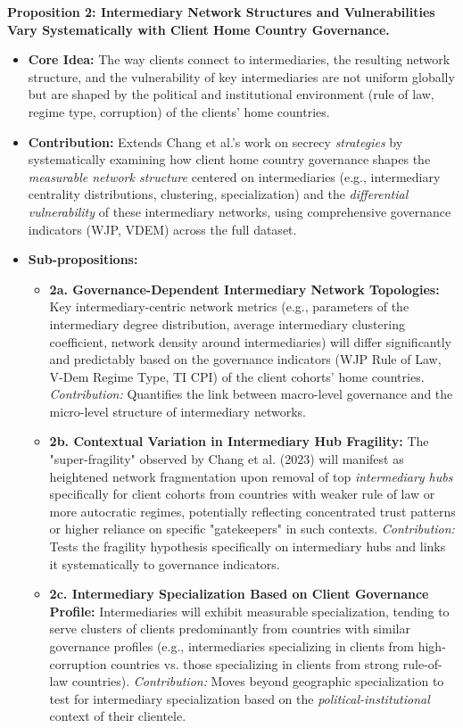 \textbf{Proposition 2: Intermediary Network Structures and Vulnerabilities Vary Systematically with Client Home Country Governance.}
\begin{itemize}[leftmargin=*]
    \item \textbf{Core Idea:} The way clients connect to intermediaries, the resulting network structure, and the vulnerability of key intermediaries are not uniform globally but are shaped by the political and institutional environment (rule of law, regime type, corruption) of the clients' home countries.
    \item \textbf{Contribution:} Extends Chang et al.'s work on secrecy \textit{strategies} by systematically examining how client home country governance shapes the \textit{measurable network structure} centered on intermediaries (e.g., intermediary centrality distributions, clustering, specialization) and the \textit{differential vulnerability} of these intermediary networks, using comprehensive governance indicators (WJP, VDEM) across the full dataset.
    \item \textbf{Sub-propositions:}
    \begin{itemize}[leftmargin=\parindent]
        \item \textbf{2a. Governance-Dependent Intermediary Network Topologies:} Key intermediary-centric network metrics (e.g., parameters of the intermediary degree distribution, average intermediary clustering coefficient, network density around intermediaries) will differ significantly and predictably based on the governance indicators (WJP Rule of Law, V-Dem Regime Type, TI CPI) of the client cohorts' home countries. \textit{Contribution:} Quantifies the link between macro-level governance and the micro-level structure of intermediary networks.
        \item \textbf{2b. Contextual Variation in Intermediary Hub Fragility:} The "super-fragility" observed by Chang et al. (2023) will manifest as heightened network fragmentation upon removal of top \textit{intermediary hubs} specifically for client cohorts from countries with weaker rule of law or more autocratic regimes, potentially reflecting concentrated trust patterns or higher reliance on specific "gatekeepers" in such contexts. \textit{Contribution:} Tests the fragility hypothesis specifically on intermediary hubs and links it systematically to governance indicators.
        \item \textbf{2c. Intermediary Specialization Based on Client Governance Profile:} Intermediaries will exhibit measurable specialization, tending to serve clusters of clients predominantly from countries with similar governance profiles (e.g., intermediaries specializing in clients from high-corruption countries vs. those specializing in clients from strong rule-of-law countries). \textit{Contribution:} Moves beyond geographic specialization to test for intermediary specialization based on the \textit{political-institutional} context of their clientele.
    \end{itemize}
\end{itemize}

